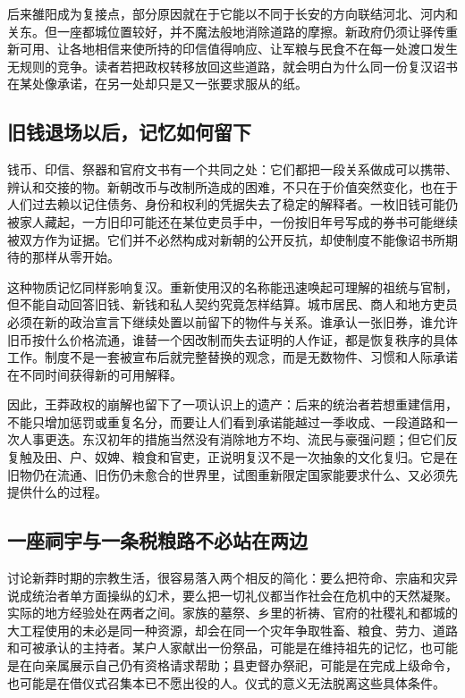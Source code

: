 后来雒阳成为复接点，部分原因就在于它能以不同于长安的方向联结河北、河内和关东。但一座都城位置较好，并不魔法般地消除道路的摩擦。新政府仍须让驿传重新可用、让各地相信来使所持的印信值得响应、让军粮与民食不在每一处渡口发生无规则的竞争。读者若把政权转移放回这些道路，就会明白为什么同一份复汉诏书在某处像承诺，在另一处却只是又一张要求服从的纸。

\subsection{旧钱退场以后，记忆如何留下}

钱币、印信、祭器和官府文书有一个共同之处：它们都把一段关系做成可以携带、辨认和交接的物。新朝改币与改制所造成的困难，不只在于价值突然变化，也在于人们过去赖以记住债务、身份和权利的凭据失去了稳定的解释者。一枚旧钱可能仍被家人藏起，一方旧印可能还在某位吏员手中，一份按旧年号写成的券书可能继续被双方作为证据。它们并不必然构成对新朝的公开反抗，却使制度不能像诏书所期待的那样从零开始。

这种物质记忆同样影响复汉。重新使用汉的名称能迅速唤起可理解的祖统与官制，但不能自动回答旧钱、新钱和私人契约究竟怎样结算。城市居民、商人和地方吏员必须在新的政治宣言下继续处置以前留下的物件与关系。谁承认一张旧券，谁允许旧币按什么价格流通，谁替一个因改制而失去证明的人作证，都是恢复秩序的具体工作。制度不是一套被宣布后就完整替换的观念，而是无数物件、习惯和人际承诺在不同时间获得新的可用解释。

因此，王莽政权的崩解也留下了一项认识上的遗产：后来的统治者若想重建信用，不能只增加惩罚或重复名分，而要让人们看到承诺能越过一季收成、一段道路和一次人事更迭。东汉初年的措施当然没有消除地方不均、流民与豪强问题；但它们反复触及田、户、奴婢、粮食和官吏，正说明复汉不是一次抽象的文化复归。它是在旧物仍在流通、旧伤仍未愈合的世界里，试图重新限定国家能要求什么、又必须先提供什么的过程。

\subsection{一座祠宇与一条税粮路不必站在两边}

讨论新莽时期的宗教生活，很容易落入两个相反的简化：要么把符命、宗庙和灾异说成统治者单方面操纵的幻术，要么把一切礼仪都当作社会在危机中的天然凝聚。实际的地方经验处在两者之间。家族的墓祭、乡里的祈祷、官府的社稷礼和都城的大工程使用的未必是同一种资源，却会在同一个灾年争取牲畜、粮食、劳力、道路和可被承认的主持者。某户人家献出一份祭品，可能是在维持祖先的记忆，也可能是在向亲属展示自己仍有资格请求帮助；县吏督办祭祀，可能是在完成上级命令，也可能是在借仪式召集本已不愿出役的人。仪式的意义无法脱离这些具体条件。

